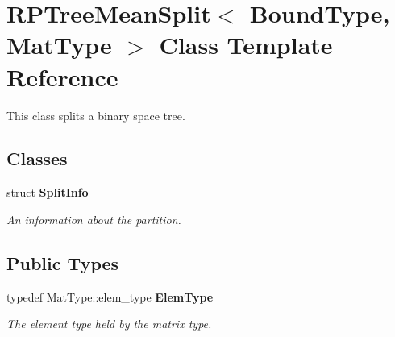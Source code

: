 \section{R\+P\+Tree\+Mean\+Split$<$ Bound\+Type, Mat\+Type $>$ Class Template Reference}
\label{classmlpack_1_1tree_1_1RPTreeMeanSplit}


This class splits a binary space tree.  


\subsection*{Classes}
\begin{DoxyCompactItemize}
\item 
struct \textbf{ Split\+Info}
\begin{DoxyCompactList}\small\item\em An information about the partition. \end{DoxyCompactList}\end{DoxyCompactItemize}
\subsection*{Public Types}
\begin{DoxyCompactItemize}
\item 
typedef Mat\+Type\+::elem\+\_\+type \textbf{ Elem\+Type}
\begin{DoxyCompactList}\small\item\em The element type held by the matrix type. \end{DoxyCompactList}\end{DoxyCompactItemize}
